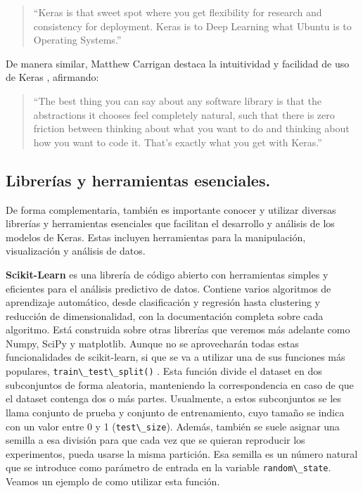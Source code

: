 \begin{quote} 
``Keras is that sweet spot where you get flexibility for research and consistency for deployment. Keras is to Deep Learning what Ubuntu is to Operating Systems.'' 
\end{quote}

De manera similar, Matthew Carrigan destaca la intuitividad y facilidad de uso de Keras \citep{keraswebsite}, afirmando:

\begin{quote}
``The best thing you can say about any software library is that the abstractions it chooses feel completely natural, such that there is zero friction between thinking about what you want to do and thinking about how you want to code it. That's exactly what you get with Keras.''
\end{quote}


\subsection{Librerías y herramientas esenciales.} \label{sec:2.3.2}

De forma complementaria, también es importante conocer y utilizar diversas librerías y herramientas esenciales que facilitan el desarrollo y análisis de los modelos de Keras. Estas incluyen herramientas para la manipulación, visualización y análisis de datos.

\textbf{Scikit-Learn} \citep{scikitlearn} es una librería de código abierto con herramientas simples y eficientes para el análisis predictivo de datos. Contiene varios algoritmos de aprendizaje automático, desde clasificación y regresión hasta clustering y reducción de dimensionalidad, con la documentación completa sobre cada algoritmo. Está construida sobre otras librerías que veremos más adelante como Numpy, SciPy y matplotlib. Aunque no se aprovecharán todas estas funcionalidades de scikit-learn, si que se va a utilizar una de sus funciones más populares, \lstinline|train\_test\_split()| \citep{traintestsplit}. Esta función divide el dataset en dos subconjuntos de forma aleatoria, manteniendo la correspondencia en caso de que el dataset contenga dos o más partes. Usualmente, a estos subconjuntos se les llama conjunto de prueba y conjunto de entrenamiento, cuyo tamaño se indica con un valor entre 0 y 1 (\lstinline|test\_size|). Además, también se suele asignar una semilla a esa división para que cada vez que se quieran reproducir los experimentos, pueda usarse la misma partición. Esa semilla es un número natural que se introduce como parámetro de entrada en la variable \lstinline|random\_state|. Veamos un ejemplo de como utilizar esta función.


